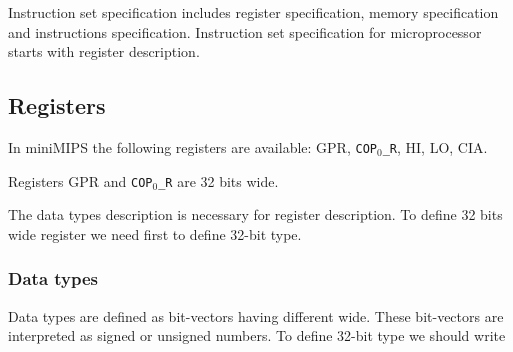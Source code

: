 \documentclass[oneside,final,12pt]{extreport}
\begin{document}
Instruction set specification includes register specification, memory specification and instructions specification. Instruction set specification for microprocessor starts with register description. 




\itshape

\bfseries


\mdseries

\upshape

\bigskip



\bigskip 

\subsection*{Registers}


\bigskip

In miniMIPS the following registers are available: GPR, \lstinline!COP!$_0$\lstinline!_R!,  HI, LO, CIA.









Registers GPR and \lstinline!COP!$_0$\lstinline!_R! are 32 bits wide. 


\bigskip

The data types description is necessary for register description. To define 32 bits wide register we need first to define 32-bit type.

\bigskip

\subsubsection*{Data types}

Data types are defined as bit-vectors having different wide. These bit-vectors are interpreted as signed or unsigned numbers. To define 32-bit type we should write 
\end{document}
